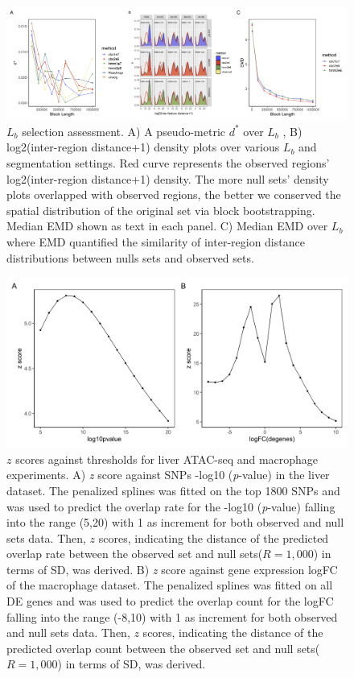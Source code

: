\documentclass{article}
\begin{document}
\begin{figure}[htbp]
\centering
\includegraphics[scale=0.35]{Figures/sfig1.jpeg}
\caption{$L_b$ selection assessment. A) A pseudo-metric $d^*$
  \citep{bickel2010subsampling} over $L_b$ , B) 
  log2(inter-region distance+1) density plots over various $L_b$ and
  segmentation settings. Red curve represents the observed regions'
  log2(inter-region distance+1) density. The more
  null sets' density
  plots overlapped with observed regions, the better we conserved the
  spatial distribution of the original set via block
  bootstrapping. Median EMD shown as text in each panel. C) Median
  EMD over $L_b$ where EMD quantified the similarity of inter-region
  distance distributions between nulls sets and observed sets.}
\label{fig:suppfig0}
\end{figure}

\begin{figure}[htbp]
\centering
\includegraphics[scale=0.3]{Figures/zscore.jpeg}
\caption{
  $z$ scores against thresholds for liver ATAC-seq and macrophage experiments.
  A) \textit{z} score against SNPs -log10 (\textit{p}-value)  in the liver
  dataset. The penalized splines was fitted on the top 1800 SNPs and was used to predict the overlap rate for the -log10 (\textit{p}-value) falling into the range (5,20) with 1 as increment for both observed and null sets data. Then, $z$ scores, indicating the distance of the predicted overlap rate between the observed set and
null sets($R = 1,000$) in terms of SD, was derived. B) \textit{z} score against gene expression logFC of the
  macrophage dataset. The penalized splines was fitted on all DE genes and was used to predict the overlap count for the logFC falling into the range (-8,10) with 1 as increment for both observed and null sets data. Then, $z$ scores, indicating the distance of the predicted overlap count between the observed set and
null sets($R = 1,000$) in terms of SD, was derived.}
\label{fig:suppfig2}
\end{figure}
\end{document}
